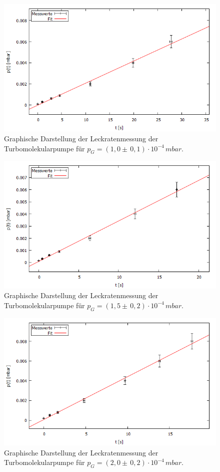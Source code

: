 \begin{figure}[H]
  \centering
  \includegraphics[width=14cm]{bilder/leckratefit2.png}
	\caption{Graphische Darstellung der Leckratenmessung der Turbomolekularpumpe für $p_G=(1,0 \pm \, 0,1)\cdot 10^{-4} \, \si{mbar}$.}
  \label{leckrate2}
\end{figure}
\begin{figure}[H]
  \centering
  \includegraphics[width=14cm]{bilder/leckratefit3.png}
	\caption{Graphische Darstellung der Leckratenmessung der Turbomolekularpumpe für $p_G=(1,5 \pm \, 0,2)\cdot 10^{-4} \, \si{mbar}$.}
  \label{leckrate3}
\end{figure}
\begin{figure}[H]
  \centering
  \includegraphics[width=14cm]{bilder/leckratefit4.png}
	\caption{Graphische Darstellung der Leckratenmessung der Turbomolekularpumpe für $p_G=(2,0 \pm \, 0,2)\cdot 10^{-4} \, \si{mbar}$.}
  \label{leckrate4}
\end{figure}
